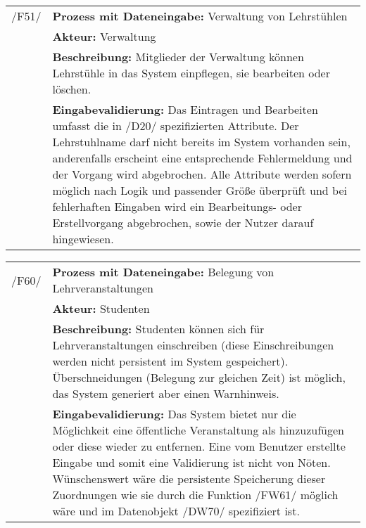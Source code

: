 \begin{tabular}{p{1.5cm}p{14.5cm}}
					
	 /F51/	& \textbf{Prozess mit Dateneingabe:} Verwaltung von Lehrstühlen \\
				& \textbf{Akteur:} Verwaltung \\
				& \textbf{Beschreibung:} Mitglieder der Verwaltung können Lehrstühle in das System einpflegen, sie bearbeiten oder löschen. \\
				& \textbf{Eingabevalidierung:} Das Eintragen und Bearbeiten umfasst die in /D20/ spezifizierten Attribute. Der Lehrstuhlname darf nicht bereits im System vorhanden sein, anderenfalls erscheint eine entsprechende Fehlermeldung und der Vorgang wird abgebrochen. Alle Attribute werden sofern möglich nach Logik und passender Größe überprüft und bei fehlerhaften Eingaben wird ein Bearbeitungs- oder Erstellvorgang abgebrochen, sowie der Nutzer darauf hingewiesen.\\[0.25cm]

\end{tabular}


\begin{tabular}{p{1.5cm}p{14.5cm}}

	 /F60/	& \textbf{Prozess mit Dateneingabe:} Belegung von Lehrveranstaltungen \\
				& \textbf{Akteur:} Studenten \\
				& \textbf{Beschreibung:} Studenten können sich für Lehrveranstaltungen einschreiben (diese Einschreibungen werden nicht persistent im System gespeichert). Überschneidungen (Belegung zur gleichen Zeit) ist möglich, das System generiert aber einen Warnhinweis. \\
				& \textbf{Eingabevalidierung:} Das System bietet nur die Möglichkeit eine öffentliche Veranstaltung als hinzuzufügen oder diese wieder zu entfernen. Eine vom Benutzer erstellte Eingabe und somit eine Validierung ist nicht von Nöten. Wünschenswert wäre die persistente Speicherung dieser Zuordnungen wie sie durch die Funktion /FW61/ möglich wäre und im Datenobjekt /DW70/ spezifiziert ist.\\[0.25cm]

\end{tabular}


